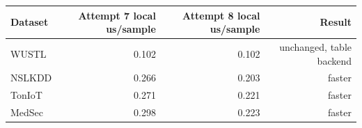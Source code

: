 \begin{tabular}{lrrr}
\toprule
Dataset & Attempt 7 local us/sample & Attempt 8 local us/sample & Result \\
\midrule
WUSTL & 0.102 & 0.102 & unchanged, table backend \\
NSLKDD & 0.266 & 0.203 & faster \\
TonIoT & 0.271 & 0.221 & faster \\
MedSec & 0.298 & 0.223 & faster \\
\bottomrule
\end{tabular}

